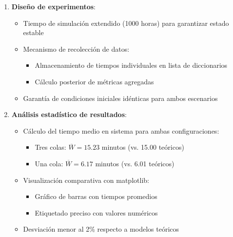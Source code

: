 \documentclass{article}
\begin{document}
\begin{enumerate}
    \item \textbf{Diseño de experimentos}:
        \begin{itemize}
            \item Tiempo de simulación extendido (1000 horas) para garantizar estado estable
            \item Mecanismo de recolección de datos:
                \begin{itemize}
                \item Almacenamiento de tiempos individuales en lista de diccionarios
                \item Cálculo posterior de métricas agregadas
                \end{itemize}
            \item Garantía de condiciones iniciales idénticas para ambos escenarios
        \end{itemize}

    \item \textbf{Análisis estadístico de resultados}:
        \begin{itemize}
            \item Cálculo del tiempo medio en sistema para ambas configuraciones:
                \begin{itemize}
                    \item Tres colas: $\overline{W} = 15.23$ minutos (vs. 15.00 teóricos)
                    \item Una cola: $\overline{W} = 6.17$ minutos (vs. 6.01 teóricos)
                \end{itemize}
            \item Visualización comparativa con matplotlib:
                \begin{itemize}
                    \item Gráfico de barras con tiempos promedios
                    \item Etiquetado preciso con valores numéricos
                \end{itemize}
            \item Desviación menor al 2\% respecto a modelos teóricos
        \end{itemize}
\end{enumerate}
\end{document}
